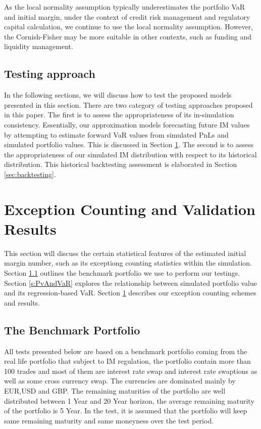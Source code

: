 \documentclass[preprint,12pt]{elsarticle}
\begin{document}
As the local normality assumption typically underestimates the portfolio VaR and initial margin, under the context of credit risk management and regulatory capital calculation, we continue to use the local normality assumption. However, the Cornish-Fisher may be more suitable in other contexts, such as funding and liquidity management.

\subsection{Testing approach}

In the following sections, we will discuss how to test the proposed models presented in this section. There are two category of testing approaches proposed in this paper. The first is to assess the appropriateness of its in-simulation consistency. Essentially, our approximation models forecasting future IM values by attempting to estimate forward VaR values from simulated PnLs and simulated portfolio values. This is discussed in Section \ref{s:ExceptionCounting}. The second is to assess the appropriateness of our simulated IM distribution with respect to its historical distribution. This historical backtesting assessment is elaborated in Section \ref{sec:backtesting}.


\section{Exception Counting and Validation Results}\label{s:ExceptionCounting}

This section will discuss the certain statistical features of the estimated initial margin number, such as its exceptiong counting statistics within the simulation. Section \ref{s:theBenchmarkPortfolio} outlines the benchmark portfolio we use to perform our testings. Section \ref{s:PvAndVaR} explores the relationship between simulated portfolio value and its regression-based VaR. Section \ref{s:ExceptionCounting} describes our exception counting schemes and results.

\subsection{The Benchmark Portfolio}\label{s:theBenchmarkPortfolio}

All tests presented below are based on a benchmark portfolio coming from the real life portfolio that subject to IM regulation, the portfolio contain more than 100 trades and most of them are interest rate swap and interest rate swaptions as well as some cross currency swap. The currencies are dominated mainly by EUR,USD and GBP. The remaining maturities of the portfolio are well distributed between 1 Year and 20 Year horizon, the average remaining maturity of the portfolio is 5 Year. In the test, it is assumed that the portfolio will keep same remaining maturity and same moneyness over the test period.
\end{document}
